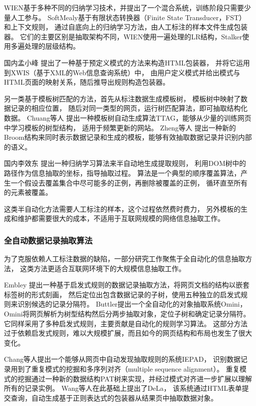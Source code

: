 WIEN基于多种不同的归纳学习技术，并提出了一个混合系统，训练阶段只需要少量人工参与。
SoftMealy基于有限状态转换器（Finite State Transducer，FST）和上下文规则，
通过自底向上的归纳学习方法，由人工标注的样本文件生成包装器。
它们的主要区别是抽取架构不同，WIEN使用一遍处理的LR结构，Stalker使用多遍处理的层级结构。

国内孟小峰
提出了一种基于预定义模式的方法来构造HTML包装器，
并将它运用到XWIS（基于XML的Web信息查询系统）中，
由用户定义模式并给出模式与HTML页面的映射关系，随后推导出规则构造包装器。

另一类基于模板树匹配的方法，首先从标注数据生成模板树，
模板树中映射了数据记录的相应位置，
随后对同一类型的网页，运行树匹配算法，即可抽取结构化数据。
Chuang等人
提出一种模板树自动生成算法TTAG，能够从少量的训练网页中学习模板的树型结构，
适用于频繁更新的网站。
Zheng等人
提出一种新的Broom结构来同时表示数据记录和生成的模板，能够有效抽取数据记录并识别内部的语义。

国内李效东
提出一种归纳学习算法来半自动地生成提取规则，
利用DOM树中的路径作为信息抽取的坐标，指导抽取过程。
算法是一个典型的顺序覆盖算法，产生一个假设去覆盖集合中尽可能多的正例，再删除被覆盖的正例，
循环直至所有的元素被覆盖。

这类半自动化方法需要人工标注的样本，这个过程依然费时费力，
另外模板的生成和维护都需要很大的成本，不适用于互联网规模的网络信息抽取工作。

\subsubsection{全自动数据记录抽取算法}

为了克服依赖人工标注数据的缺陷，一部分研究工作聚焦于全自动化的信息抽取方法，
这类方法更适合互联网环境下的大规模信息抽取工作。

Embley
提出一种基于启发式规则的数据记录抽取方法，将网页文档的结构以嵌套标签树的形式刻画，
然后定位出包含数据记录的子树，使用五种独立的启发式规则来识别候选的记录分隔符。
Buttler提出一个全自动化的对象抽取系统Omini，
Omini将网页解析为树型结构然后分两步抽取对象，定位子树和确定记录分隔符。
它同样采用了多种启发式规则，主要贡献是自动化的规则学习算法。
这部分方法过于依赖启发式规则，难以大规模扩展，而且如今的网页结构和布局也发生了很大变化。

Chang等人提出一个能够从网页中自动发现抽取规则的系统IEPAD，
识别数据记录用到了重复模式的挖掘和多序列对齐（multiple sequence alignment）。
重复模式的挖掘通过一种新的数据结构PAT树来实现，并经过模式对齐进一步扩展以理解所有的记录实例。
Wang等人在此基础上提出了DeLa，
该系统通过HTML表单提交查询，自动生成基于正则表达式的包装器从结果页中抽取数据对象。

